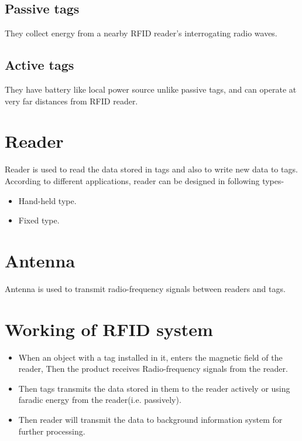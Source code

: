 \documentclass[12pt, a4paper]{report}
\begin{document}
\subsection{Passive tags}
They collect energy from a nearby RFID reader's interrogating radio waves.
\subsection{Active tags}
They have battery like local power source unlike passive tags, and can operate at very far distances from RFID reader.

\section{Reader}
Reader is used to read the data stored in tags and also to write new data to tags. According to different applications, reader can be designed in following types- 
\begin{itemize}
    \item Hand-held type.
    \item Fixed type.
\end{itemize}

\section{Antenna}
Antenna is used to transmit radio-frequency signals between readers and tags.
\section{Working of RFID system}
\begin{itemize}
    \item When an object with a tag installed in it, enters the magnetic field of the reader, Then the product receives Radio-frequency signals from the reader.
    \item Then tags transmits the data stored in them to the reader actively or using faradic energy from the reader(i.e. passively).
    \item Then reader will transmit the data to background information system for further processing.
\end{itemize}
\end{document}
